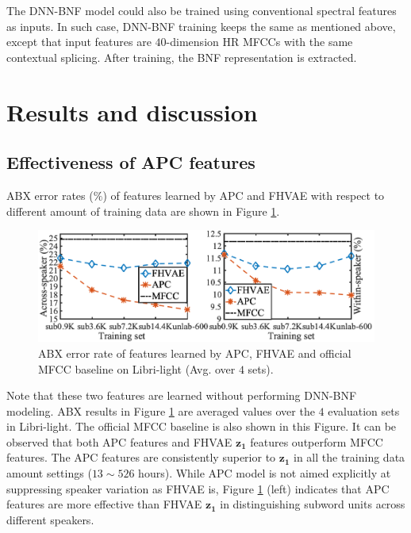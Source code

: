 \documentclass[a4paper]{article}
\begin{document}
The DNN-BNF model could also be trained using conventional spectral features as inputs. 
In such case, DNN-BNF training keeps the same as mentioned above, except that input features are $40$-dimension HR MFCCs with the same contextual splicing. After training, the BNF representation is   extracted.

\section{Results and discussion}
\subsection{Effectiveness of APC features }

ABX error rates ($\%$) of features learned by APC and FHVAE with respect to different amount of training data are shown in Figure \ref{fig:apc_fhvae_mfcc}.
\begin{figure}[!t]
    \centering
    \includegraphics[width=\linewidth]{apc_fhvae_mfcc.png}
    \caption{ABX error rate  of features learned by APC, FHVAE and official MFCC baseline on Libri-light (Avg. over $4$ sets). }
    \label{fig:apc_fhvae_mfcc}
\end{figure}
Note that these two features are learned without performing DNN-BNF modeling. ABX results in  Figure \ref{fig:apc_fhvae_mfcc} are averaged values over the $4$ evaluation sets in Libri-light. The official MFCC baseline   \cite{kahn2019librilight} is also shown in this Figure. It can be observed that both APC features and FHVAE $\bm{z_1}$ features outperform MFCC features. The APC features are consistently superior to $\bm{z_1}$ in all the training data amount settings ($13 \sim 526$ hours). 
While APC model is not aimed explicitly at suppressing speaker variation as FHVAE is,   
Figure \ref{fig:apc_fhvae_mfcc} (left) indicates that APC features are more effective than FHVAE $\bm{z_1}$ in distinguishing subword units across different speakers.
\end{document}
